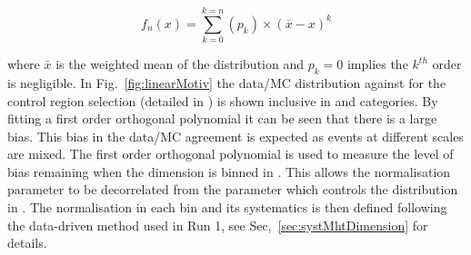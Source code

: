 \begin{equation}
  \label{equ:orthog-polynomial}
  f_n(x) = \sum_{k=0}^{k=n}{(p_k)\times(\bar{x}-x)^k}
\end{equation}

where $\bar{x}$ is the weighted mean of the distribution and $p_k = 0$ 
implies the $k^{th}$ order is negligible.
In Fig.~\ref{fig:linearMotiv} the data/MC 
distribution against \mht for the control region selection 
(detailed in \cite{Khachatryan:2016pxa}) is shown inclusive 
in \scalht and categories. By fitting a first order
orthogonal polynomial it can be seen that there is a large bias. 
This bias in the data/MC agreement is expected as events 
at different scales are mixed.
The first order orthogonal polynomial
is used to measure the level of bias remaining 
when the \mht dimension is binned in \scalht.
This allows the normalisation parameter to be
decorrelated from the parameter which controls
the distribution in \mht.
The normalisation in each \scalht bin and its systematics 
is then defined following the data-driven method used in Run 1, see Sec,~\ref{sec:systMhtDimension} for details.

